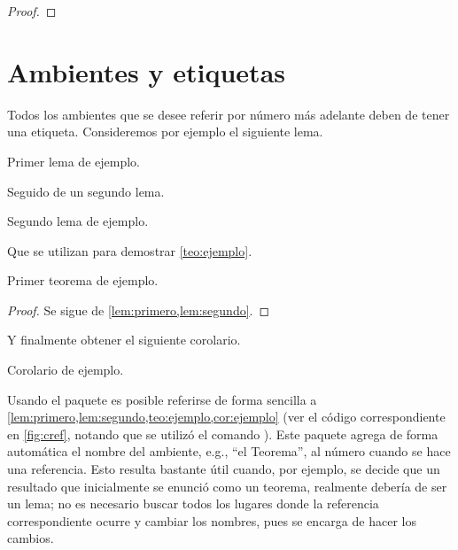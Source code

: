 \begin{proof}
    
    \end{proof}

 

\section{Ambientes y etiquetas}
\label{sec:etiquetas}

Todos los ambientes que se desee referir por n\'umero m\'as adelante deben de
tener una etiqueta.  Consideremos por ejemplo el siguiente lema.

\begin{lema}
\label{lem:primero}
Primer lema de ejemplo.
\end{lema}

Seguido de un segundo lema.

\begin{lema}
\label{lem:segundo}
Segundo lema de ejemplo.
\end{lema}

Que se utilizan para demostrar \cref{teo:ejemplo}.

\begin{teorema}
\label{teo:ejemplo}
Primer teorema de ejemplo.
\end{teorema}

\begin{proof}
Se sigue de \cref{lem:primero,lem:segundo}.
\end{proof}

Y finalmente obtener el siguiente corolario.

\begin{corolario}
\label{cor:ejemplo}
Corolario de ejemplo.
\end{corolario}

Usando el paquete \href{http://tug.ctan.org/tex-archive/macros/latex/contrib/%
cleveref/cleveref.pdf}{} es posible referirse de
forma sencilla a \cref{lem:primero,lem:segundo,teo:ejemplo,cor:ejemplo} (ver el
c\'odigo correspondiente en \cref{fig:cref}, notando que se utiliz\'o el comando
).   Este paquete agrega de forma autom\'atica el
nombre del ambiente, e.g., ``el Teorema'', al n\'umero cuando se hace una
referencia.   Esto resulta bastante \'util cuando, por ejemplo, se decide que un
resultado que inicialmente se enunci\'o como un teorema, realmente deber\'ia de
ser un lema; no es necesario buscar todos los lugares donde la referencia
correspondiente ocurre y cambiar los nombres, pues  se encarga de
hacer los cambios.

